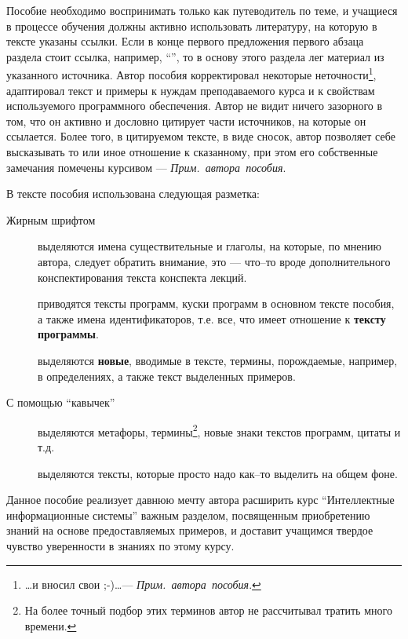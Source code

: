 \documentclass[12pt, openany, twoside]{book} %
\def\AR{{\em Прим.~автора~пособия}}
\begin{document}
Пособие необходимо воспринимать только как путеводитель по теме, и учащиеся в процессе обучения должны активно использовать литературу, на которую в тексте указаны ссылки. Если в конце первого предложения первого абзаца раздела стоит ссылка, например, ``\cite{AIDictionary}'', то в основу этого раздела лег материал из указанного источника. Автор пособия корректировал некоторые неточности\footnote{\ldots и вносил свои ;-)\ldots --- \AR.}, адаптировал текст и примеры к нуждам преподаваемого курса и к свойствам используемого программного обеспечения. Автор не видит ничего зазорного в том, что он активно и дословно цитирует части источников, на которые он ссылается. Более того, в цитируемом тексте, в виде сносок, автор позволяет себе высказывать то или иное отношение к сказанному, при этом его собственные замечания помечены курсивом --- \AR.

В тексте пособия использована следующая разметка:
\begin{description}
\item[Жирным шрифтом] выделяются имена существительные и глаголы, на которые, по мнению автора, следует обратить внимание, это --- что--то вроде дополнительного конспектирования текста конспекта лекций.
\item[] приводятся тексты программ, куски программ в основном тексте пособия, а также имена идентификаторов, т.е. все, что имеет отношение к {\bf тексту программы}.
\item[] выделяются {\bf новые}, вводимые в тексте, термины, порождаемые, например, в определениях, а также текст выделенных примеров.
\item[\normalfont С помощью ``кавычек''] выделяются метафоры, термины\footnote{На более точный подбор этих терминов автор не рассчитывал тратить много времени.}, новые знаки текстов программ, цитаты и т.д.
\item[] вы\-де\-ля\-ю\-тся тексты, которые просто надо как--то выделить на общем фоне.
\end{description}

Данное пособие реализует давнюю мечту автора расширить курс ``Интеллектные информационные системы'' важным разделом, посвященным приобретению знаний на основе предоставляемых примеров, и  доставит учащимся твердое чувство уверенности в знаниях по этому курсу.
\end{document}
